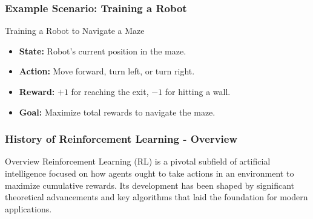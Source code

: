 \documentclass{beamer}
\begin{document}
\begin{frame}[fragile]
    \frametitle{Example Scenario: Training a Robot}
    \begin{block}{Training a Robot to Navigate a Maze}
        \begin{itemize}
            \item \textbf{State:} Robot's current position in the maze.
            \item \textbf{Action:} Move forward, turn left, or turn right.
            \item \textbf{Reward:} $+1$ for reaching the exit, $-1$ for hitting a wall.
            \item \textbf{Goal:} Maximize total rewards to navigate the maze.
        \end{itemize}
    \end{block}
\end{frame}

\begin{frame}[fragile]
    \frametitle{History of Reinforcement Learning - Overview}
    \begin{block}{Overview}
        Reinforcement Learning (RL) is a pivotal subfield of artificial intelligence focused on how agents ought to take actions in an environment to maximize cumulative rewards. Its development has been shaped by significant theoretical advancements and key algorithms that laid the foundation for modern applications.
    \end{block}
\end{frame}
\end{document}
